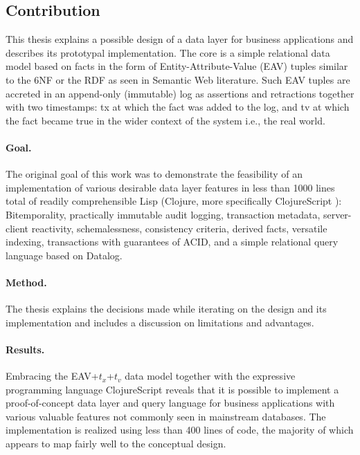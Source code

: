 \subsection{Contribution}
This thesis explains a possible design of a data layer for business applications and describes its prototypal implementation. The core is a simple relational data model based on facts in the form of Entity-Attribute-Value (EAV) tuples similar to the \gls{6NF} or the \gls{RDF} as seen in Semantic Web literature. Such EAV tuples are accreted in an append-only (immutable) log as assertions and retractions together with two timestamps: \gls{tx} at which the fact was added to the log, and \gls{tv} at which the fact became true in the wider context of the system \cite{snodgrass1992temporal} i.e., the real world.


\paragraph{Goal.}
The original goal of this work was to demonstrate the feasibility of an implementation of various desirable data layer features in less than 1000 lines total of readily comprehensible Lisp (Clojure, more specifically ClojureScript \cite{hickey2008clojure}): Bitemporality, practically immutable audit logging, transaction metadata, server-client reactivity, schemalessness, consistency criteria, derived facts, versatile indexing, transactions with guarantees of \gls{ACID}, and a simple relational query language based on Datalog.

\paragraph{Method.}
The thesis explains the decisions made while iterating on the design and its implementation and includes a discussion on limitations and advantages.

\paragraph{Results.}
Embracing the EAV+$t_x$+$t_v$ data model together with the expressive programming language ClojureScript reveals that it is possible to implement a proof-of-concept data layer and query language for business applications with various valuable features not commonly seen in mainstream databases. The implementation is realized using less than 400 lines of code, the majority of which appears to map fairly well to the conceptual design.
